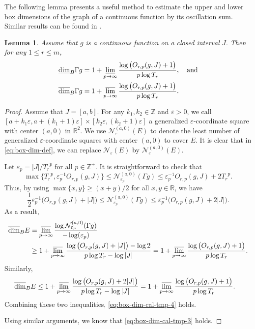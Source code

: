 \documentclass[11pt]{amsart}
\newtheorem{lem}[thm]{Lemma}
\theoremstyle{definition}
\theoremstyle{remark}
\numberwithin{equation}{section}
\newcommand{\bR}{{\mathbb R}}
\newcommand{\Z}{{\mathbb Z}}
\def\vep{\varepsilon}
\def\updimB{\overline{\dim}_B}
\def\lowdimB{\underline{\dim}_B}
\begin{document}
The following lemma presents a useful method to estimate the upper and lower box dimensions of the graph of a continuous function by its oscillation sum. Similar results can be found in \cite{Fal14,JR23,JR24,RSY09}.

\begin{lem}\label{lem:box-dim-new-x1}
	Assume that $g$ is a continuous function on a closed interval $J$. Then for any $1 \leq r \leq m$, 
	\begin{align}
		&\lowdimB \Gamma g = 1+\varliminf_{p\to\infty}\frac{\log \big( O_{r,p}(g,J)+1\big)}{p\log T_r}, 	\quad \mbox{and} \label{eq:box-dim-cal-tmp-3} \\
		&\updimB \Gamma g = 1+\varlimsup_{p\to\infty} \frac{\log \big(O_{r,p}(g,J)+1\big)}{p\log T_r}.
		\label{eq:box-dim-cal-tmp-4}
	\end{align}
\end{lem}
\begin{proof}
	Assume that $J=[a,b]$. For any $k_1, k_2\in\mathbb{Z}$ and $\varepsilon>0$, we call $[a+k_1\varepsilon,a+(k_1+1)\varepsilon] \times [k_2\varepsilon,(k_2+1)\varepsilon]$ a generalized $\varepsilon$-coordinate square with center $(a,0)$ in $\mathbb{R}^2$. We use $\mathcal{N}_{\varepsilon}^{(a,0)}(E)$ to denote the least number of generalized $\varepsilon$-coordinate squares with center $(a,0)$ to cover $E$. It is clear that in \eqref{eq:box-dim-def}, we can replace $\mathcal{N}_{\varepsilon}(E)$ by $\mathcal{N}_{\varepsilon}^{(a,0)}(E)$.
	
	Let $\vep_p=|J|/{T_r}^{p}$ for all $p \in \Z^+$.
	It is straightforward to check that
	\[
	    \max\{{T_r}^p, \vep_p^{-1} O_{r,p}(g,J)\} \leq \mathcal{N}_{\varepsilon_p}^{(a,0)}(\Gamma g)  \leq \vep_p^{-1}  O_{r,p}(g,J) +2{T_r}^p.
	\]
	Thus, by using $\max\{x,y\}\geq (x+y)/2$ for all $x,y\in \bR$, we have
		\begin{equation}\label{eq:boxxx1}
			\frac{1}{2}\vep_p^{-1} \big(O_{r,p}(g,J) +|J|\big) \leq \mathcal{N}_{\varepsilon_p}^{(a,0)}(\Gamma g)  \leq \vep_p^{-1} \big(O_{r,p}(g,J) +2|J|\big).
		\end{equation} 
	As a result,
	\begin{align*}
		\updimB E 
		&= \varlimsup_{p\to \infty} \frac{\log \mathcal{N}_{\varepsilon_p}^{(a,0)}(\Gamma g) }{-\log (\vep_p)}	\\
		&\geq 1+\varlimsup_{p\to \infty} \frac{\log \big( O_{r,p}(g,J) +|J| \big) -\log 2 }{ p \log T_r- \log|J|}  
		=1+ \varlimsup_{p\to \infty} \frac{\log \big(   O_{r,p}(g,J) +1\big)}{ p \log T_r}.
	\end{align*}
	Similarly,
	\begin{align*}
		\updimB E 
		&\leq 1+\varlimsup_{p\to \infty} 	 \frac{ \log \big(    O_{r,p}(g,J) +2|J| \big)}{ p \log T_r- \log|J|}  
		=1+ \varlimsup_{p\to \infty} \frac{\log \big(   O_{r,p}(g,J) +1\big)}{ p \log T_r}.
	\end{align*}
	Combining these two inequalities, \eqref{eq:box-dim-cal-tmp-4} holds.
	
	Using similar arguments, we know that \eqref{eq:box-dim-cal-tmp-3} holds.
\end{proof}
\end{document}
